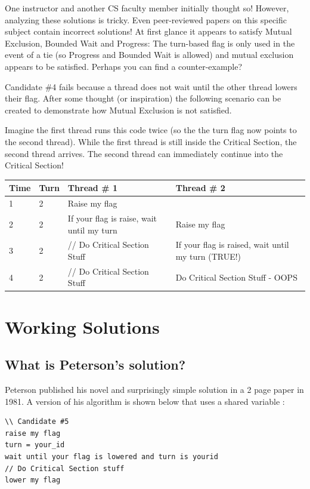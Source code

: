 One instructor and another CS faculty member initially thought so!
However, analyzing these solutions is tricky.
Even peer-reviewed papers on this specific subject contain incorrect solutions!
At first glance it appears to satisfy Mutual Exclusion, Bounded Wait and Progress: The turn-based flag is only used in the event of a tie (so Progress and Bounded Wait is allowed) and mutual exclusion appears to be satisfied.
Perhaps you can find a counter-example?

Candidate \#4 fails because a thread does not wait until the other thread lowers their flag.
After some thought (or inspiration) the following scenario can be created to demonstrate how Mutual Exclusion is not satisfied.

Imagine the first thread runs this code twice (so the the turn flag now points to the second thread).
While the first thread is still inside the Critical Section, the second thread arrives.
The second thread can immediately continue into the Critical Section!

\begin{tabular}{|l|l|l|l|}
Time & Turn & Thread \# 1 & Thread \# 2 \\ \hline
1 & 2 & Raise my flag & \\
2 & 2 & If your flag is raise, wait until my turn & Raise my flag \\
3 & 2 & // Do Critical Section Stuff & If your flag is raised, wait until my turn (TRUE!) \\
4 & 2 & // Do Critical Section Stuff & Do Critical Section Stuff - OOPS \\
\end{tabular}

\section{Working Solutions}\label{working-solutions}

\subsection{What is Peterson's solution?}\label{what-is-petersons-solution}

Peterson published his novel and surprisingly simple solution in a 2 page paper in 1981. A version of his algorithm is shown below that uses a shared variable :

\begin{lstlisting}
\\ Candidate #5
raise my flag
turn = your_id
wait until your flag is lowered and turn is yourid
// Do Critical Section stuff
lower my flag
\end{lstlisting}

